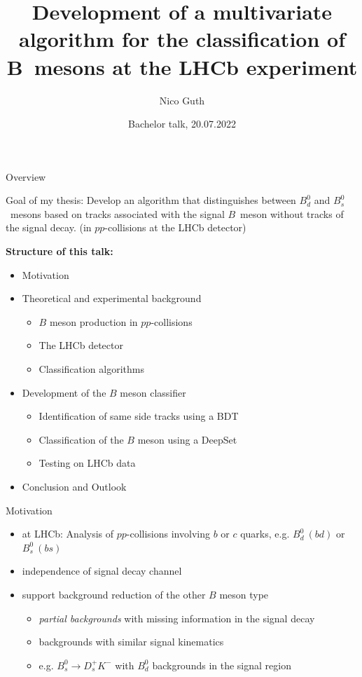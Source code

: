 \documentclass[aspectratio=1610, 10pt]{beamer}
\title{Development of a multivariate algorithm for the classification of B~mesons at the LHCb experiment}
\author[N.~Guth]{Nico Guth}
\institute[AG Albrecht]{Arbeitsgruppe Albrecht \\ Fakultät Physik}
\date{Bachelor talk, 20.07.2022}
\begin{document}
\maketitle

\begin{frame}{Overview}
  \begin{block}{Goal of my thesis:}
    Develop an algorithm that distinguishes between $B^0_d$ and $B^0_s$~mesons based on tracks associated with the signal $B$~meson without tracks of the signal decay. (in $pp$-collisions at the LHCb detector) 
  \end{block}

  \medskip
  \textbf{Structure of this talk:}
  \begin{itemize}
    \item Motivation
    \item Theoretical and experimental background
      \begin{itemize}
        \item $B$ meson production in $pp$-collisions
        \item The LHCb detector
        \item Classification algorithms
      \end{itemize}
    \item Development of the $B$ meson classifier
      \begin{itemize}
        \item Identification of same side tracks using a BDT
        \item Classification of the $B$ meson using a DeepSet
        \item Testing on LHCb data
      \end{itemize}
    \item Conclusion and Outlook
  \end{itemize}

\end{frame}

\begin{frame}{Motivation}
  \begin{itemize}
    \item at LHCb: Analysis of $pp$-collisions involving $b$ or $c$ quarks, e.g. $B^0_d \: (bd)$ or $B^0_s \: (bs)$
    \item independence of signal decay channel
    \item support background reduction of the other $B$ meson type
    \begin{itemize}
      \item \textit{partial backgrounds} with missing information in the signal decay
      \item backgrounds with similar signal kinematics
      \item e.g. $B^0_s \rightarrow D^+_s K^-$ with $B^0_d$ backgrounds in the signal region
    \end{itemize}
  \end{itemize}
\end{frame}
\end{document}
